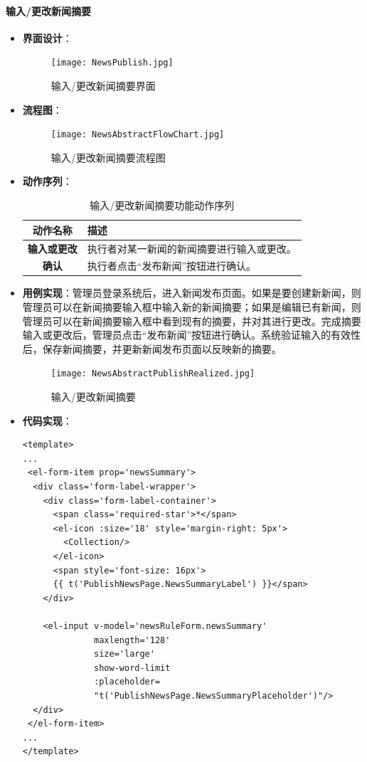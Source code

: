 \paragraph{输入/更改新闻摘要}
\begin{itemize}
	\item \textbf{界面设计}：
	\begin{figure}[H]
		\centering
		\texttt{[image: NewsPublish.jpg]}
		\caption{输入/更改新闻摘要界面}
		\label{NewsPublish}
	\end{figure}
	\item \textbf{流程图}：
	\begin{figure}[H]
		\centering
		\texttt{[image: NewsAbstractFlowChart.jpg]}
		\caption{输入/更改新闻摘要流程图}
		\label{NewsAbstractFlowChart}
	\end{figure}
	\item \textbf{动作序列}：
	\begin{table}[H]
		\centering
		\caption{输入/更改新闻摘要功能动作序列}
		\renewcommand\arraystretch{1.5}
		\begin{tabular}{|c|>{\raggedright\arraybackslash}p{10cm}|}
			\hline
			\textbf{动作名称} & \textbf{描述} \\ \hline
			\textbf{输入或更改} & 执行者对某一新闻的新闻摘要进行输入或更改。 \\ \hline
			\textbf{确认} & 执行者点击“发布新闻”按钮进行确认。 \\ \hline
		\end{tabular}
	\end{table}
	\item \textbf{用例实现}：管理员登录系统后，进入新闻发布页面。如果是要创建新新闻，则管理员可以在新闻摘要输入框中输入新的新闻摘要；如果是编辑已有新闻，则管理员可以在新闻摘要输入框中看到现有的摘要，并对其进行更改。完成摘要输入或更改后，管理员点击“发布新闻”按钮进行确认。系统验证输入的有效性后，保存新闻摘要，并更新新闻发布页面以反映新的摘要。
	\begin{figure}[H]
		\centering
		\texttt{[image: NewsAbstractPublishRealized.jpg]}
		\caption{输入/更改新闻摘要}
		\label{NewsAbstractPublishRealized}
	\end{figure}
	\item \textbf{代码实现}：
	\begin{verbatim}
<template>
...
 <el-form-item prop='newsSummary'>
  <div class='form-label-wrapper'>
    <div class='form-label-container'>
      <span class='required-star'>*</span>
      <el-icon :size='18' style='margin-right: 5px'>
        <Collection/>
      </el-icon>
      <span style='font-size: 16px'>
      {{ t('PublishNewsPage.NewsSummaryLabel') }}</span>
    </div>
	
    <el-input v-model='newsRuleForm.newsSummary'
              maxlength='128'
              size='large'
              show-word-limit
              :placeholder=
              "t('PublishNewsPage.NewsSummaryPlaceholder')"/>
  </div>
 </el-form-item>
...
</template>
	\end{verbatim}
\end{itemize}

